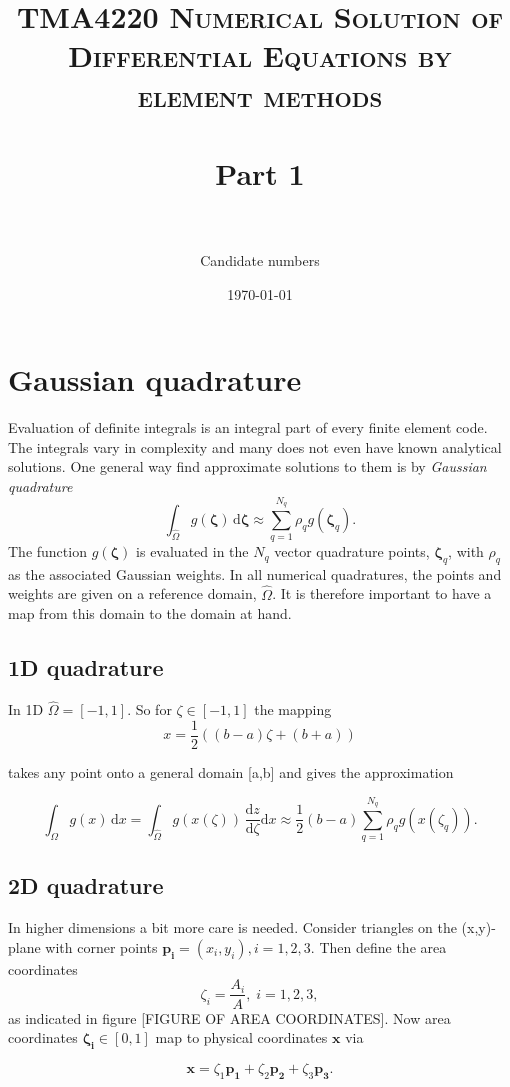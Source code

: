 \documentclass[paper=a4, fontsize=11pt]{scrartcl} %
\title{	
\normalfont \normalsize 
\textsc{TMA4220 Numerical Solution of Differential Equations by element methods} \\ [25pt] %
\horrule{0.5pt} \\[0.4cm] %
\huge Part 1 \\ %
\horrule{2pt} \\[0.5cm] %
}
\author{Candidate numbers} %
\date{\normalsize\today} %
\begin{document}
\maketitle

\section{Gaussian quadrature}
Evaluation of definite integrals is an integral part of every finite element code. The integrals vary in complexity and many does not even have known analytical solutions. One general way find approximate solutions to them is by  \textit{Gaussian quadrature}
\[ \int_{\hat{\Omega}} \! g(\mathbf{\zeta}) \, \mathrm{d}\mathbf{\zeta} \approx \sum_{q=1}^{N_q} \rho_{q}g(\mathbf{\zeta}_q).
\]
The function $g(\mathbf{\zeta})$ is evaluated in the $N_q$ vector quadrature points, $\mathbf{\zeta}_q$, with $\rho_q$ as the associated Gaussian weights. In all numerical quadratures, the points and weights are given on a reference domain, $\hat{\Omega}$. It is therefore important to have a map from this domain to the domain at hand.

\subsection{1D quadrature}

In 1D $\hat{\Omega}=[-1,1]$. So for $\zeta \in [-1,1]$ the mapping
\[ x=\frac{1}{2} \left((b-a) \zeta +(b+a)\right)
\]

takes any point onto a general domain [a,b] and gives the approximation

\[ \int_{\Omega} \! g(x) \, \mathrm{d}x = \int_{\hat{\Omega}} \! g\left(x(\zeta)\right) \, \frac{\mathrm{d}z}{\mathrm{d}\zeta}\mathrm{d}x \approx \frac{1}{2}(b-a) \sum_{q=1}^{N_q} \rho_{q}g(x(\zeta_q)).
\]

\subsection{2D quadrature}
In higher dimensions a bit more care is needed. Consider triangles on the (x,y)-plane with corner points $\mathbf{p_i}=(x_i,y_i), i=1,2,3$. Then define the area coordinates 
\[ \zeta_i = \frac{A_i}{A}, \; i=1,2,3,\]
as indicated in figure [FIGURE OF AREA COORDINATES]. Now area coordinates $\mathbf{\zeta_i} \in [0,1]$ map to physical coordinates $\mathbf{x}$ via

\[ \mathbf{x} = \zeta_1\mathbf{p_1} +\zeta_2\mathbf{p_2} +\zeta_3\mathbf{p_3}.
\]
\end{document}
